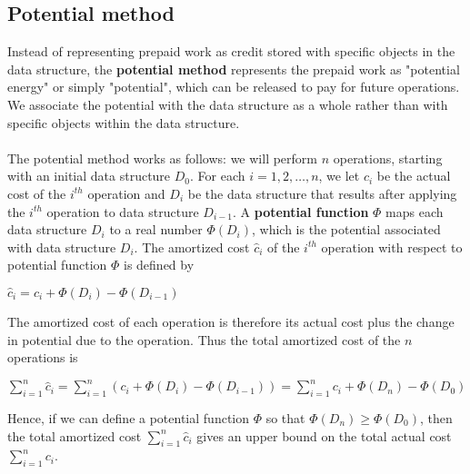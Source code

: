 \documentclass[a4paper]{article}
\begin{document}
\subsection{Potential method}
Instead of representing prepaid work as credit stored with specific objects in the data structure, the \textbf{potential method} represents the prepaid work as "potential energy" or simply "potential", which can be released to pay for future operations. We associate the potential with the data structure as a whole rather than with specific objects within the data structure.\\\\
The potential method works as follows: we will perform $n$ operations, starting with an initial data structure $D_0$. For each $i=1,2,\dots,n$, we let $c_i$ be the actual cost of the $i^{th}$ operation and $D_i$ be the data structure that results after applying the $i^{th}$ operation to data structure $D_{i-1}$. A \textbf{potential function} $\Phi$ maps each data structure $D_i$ to a real number $\Phi(D_i)$, which is the potential associated with data structure $D_i$. The amortized cost $\hat{c}_i$ of the $i^{th}$ operation with respect to potential function $\Phi$ is defined by
\begin{center}
	$\hat{c}_i = c_i + \Phi(D_i) - \Phi(D_{i-1})$
\end{center}
The amortized cost of each operation is therefore its actual cost plus the change in potential due to the operation. Thus the total amortized cost of the $n$ operations is
\begin{center}
	$\sum\limits_{i=1}^{n}\hat{c}_i = \sum\limits_{i=1}^{n}(c_i + \Phi(D_i) - \Phi(D_{i-1}))
	 = \sum\limits_{i=1}^{n}c_i + \Phi(D_n) - \Phi(D_{0})$
\end{center}
Hence, if we can define a potential function $\Phi$ so that $\Phi(D_n) \ge \Phi(D_0)$, then the total amortized cost $\sum\limits_{i=1}^{n}\hat{c}_i$ gives an upper bound on the total actual cost $\sum\limits_{i=1}^{n}c_i$.
\end{document}
